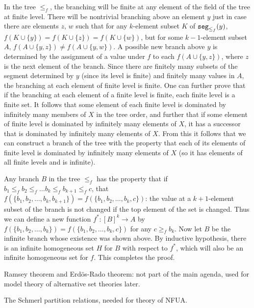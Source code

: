 \documentclass[12pt]{book}
\begin{document}
\begin{description}
In the tree $\leq_f$, the branching will be finite at any element of
the field of the tree at finite level.  There will be nontrivial
branching above an element $y$ just in case there are elements $z$,
$w$ such that for any $k$-element subset $K$ of ${\tt
seg}_{\leq_f}(y)$, $f(K\cup \{y\}) = f(K \cup \{z\}) = f(K \cup
\{w\})$, but for some $k-1$-element subset $A$, $f(A \cup \{y,z\})
\neq f(A \cup \{y,w\})$.  A possible new branch above $y$ is
determined by the assignment of a value under $f$ to each $f(A \cup
\{y,z\})$, where $z$ is the next element of the branch.  Since there
are finitely many subsets of the segment determined by $y$ (since its
level is finite) and finitely many values in $A$, the branching at
each element of finite level is finite.  One can further prove that if
the branching at each element of a finite level is finite, each finite
level is a finite set.  It follows that some element of each finite
level is dominated by infinitely many members of $X$ in the tree
order, and further that if some element of finite level is dominated
by infinitely many elements of $X$, it has a successor that is
dominated by infinitely many elements of $X$.  From this it follows
that we can construct a branch of the tree with the property that each
of its elements of finite level is dominated by infinitely many
elements of $X$ (so it has elements of all finite levels and is infinite). 

Any branch $B$ in the tree $\leq_f$ has the property that if $b_1
\leq_f b_2 \leq_f \ldots b_k \leq_f b_{k+1} \leq_f c$, that
$f(\{b_1,b_2,\ldots,b_{k},b_{k+1}\}) = f(\{b_1,b_2,\ldots,b_{k},c\})$:
the value at a $k+1$-element subset of the branch is not changed if
the top element of the set is changed.  Thus we can define a new
function $f^*:[B]^k \rightarrow A$ by $f(\{b_1,b_2,\ldots,b_{k}\}) =
f(\{b_1,b_2,\ldots,b_{k},c\})$ for any $c \geq_f b_k$.  Now let $B$ be
the infinite branch whose existence was shown above.  By inductive
hypothesis, there is an infinite homogeneous set $H$ for $B$ with respect to
$f^*$, which will also be an infinite homogeneous set for $f$.  This
completes the proof.

\end{description}



Ramsey theorem and Erd\"os-Rado theorem: not part of the main agenda,
used for model theory of alternative set theories later.

The Schmerl partition relations, needed for theory of NFUA.
\end{document}
